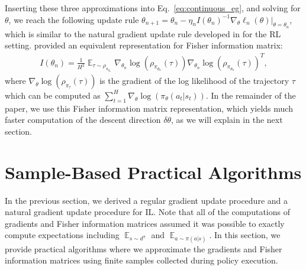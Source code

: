 \documentclass{article}
\newcommand{\BB}[1]{\textcolor{red}{\bf Byron: {#1}}}
\begin{document}
Inserting these three approximations into Eq.~\ref{eq:continuous_eg}, and solving for $\theta$, we reach the following update rule $\theta_{n+1} = \theta_n - \eta_{n}I(\theta_n)^{-1}\nabla_{\theta}\ell_n(\theta)|_{\theta =\theta_n}$,
which is similar to the natural gradient update rule developed in \cite{kakade2002natural} %
for the RL setting. 
\citet{bagnell2003covariant} provided an equivalent representation for  Fisher information matrix: %
\begin{align}
\label{eq:fisher_traj}
I(\theta_n )=\frac{1}{H^2}\mathop{\mathop{\mathbb{E}}}_{\tau\sim \rho_{\pi_{\theta_n}}}\nabla_{\theta_n}\log(\rho_{\pi_{\theta_n}}(\tau))\nabla_{\theta_n}\log(\rho_{\pi_{\theta_n}}(\tau))^T,
\end{align} where $\nabla_{\theta}\log(\rho_{\pi_{\tau}}(\tau))$ is the gradient of the log likelihood of the trajectory $\tau$ which can be computed as $\sum_{t=1}^H\nabla_{\theta}\log(\pi_{\theta}(a_t|s_t))$. In the remainder of the paper, we use this Fisher information matrix representation, which yields much faster computation of the descent direction $\delta\theta$, as we will explain in the next section.





\section{Sample-Based Practical Algorithms}
In the previous section, we derived a regular gradient update procedure and a natural gradient update procedure for IL. Note that all of the computations of gradients and Fisher information matrices assumed it was possible to exactly compute expectations including $\mathop{\mathbb{E}}_{s\sim d^{\pi}}$ and $\mathop{\mathbb{E}}_{a\sim \pi(a|s)}$. In this section, we provide practical algorithms where we approximate the gradients and Fisher information matrices using finite samples collected during policy execution. 
\end{document}

